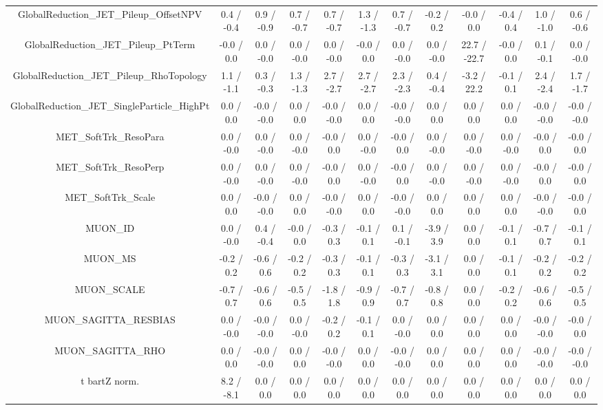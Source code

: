 \begin{table}[htbp]
\begin{center}
\begin{tabular}{|c|c|c|c|c|c|c|c|c|c|c|c|}
  GlobalReduction_JET_Pileup_OffsetNPV & 0.4 / -0.4 & 0.9 / -0.9 & 0.7 / -0.7 & 0.7 / -0.7 & 1.3 / -1.3 & 0.7 / -0.7 & -0.2 / 0.2 & -0.0 / 0.0 & -0.4 / 0.4 & 1.0 / -1.0 & 0.6 / -0.6 \\ 
  GlobalReduction_JET_Pileup_PtTerm & -0.0 / 0.0 & 0.0 / -0.0 & 0.0 / -0.0 & 0.0 / -0.0 & -0.0 / 0.0 & 0.0 / -0.0 & 0.0 / -0.0 & 22.7 / -22.7 & -0.0 / 0.0 & 0.1 / -0.1 & 0.0 / -0.0 \\ 
  GlobalReduction_JET_Pileup_RhoTopology & 1.1 / -1.1 & 0.3 / -0.3 & 1.3 / -1.3 & 2.7 / -2.7 & 2.7 / -2.7 & 2.3 / -2.3 & 0.4 / -0.4 & -3.2 / 22.2 & -0.1 / 0.1 & 2.4 / -2.4 & 1.7 / -1.7 \\ 
  GlobalReduction_JET_SingleParticle_HighPt & 0.0 / 0.0 & -0.0 / -0.0 & 0.0 / 0.0 & -0.0 / -0.0 & 0.0 / 0.0 & -0.0 / -0.0 & 0.0 / 0.0 & 0.0 / 0.0 & 0.0 / 0.0 & -0.0 / -0.0 & -0.0 / -0.0 \\ 
  MET_SoftTrk_ResoPara & 0.0 / -0.0 & 0.0 / -0.0 & 0.0 / -0.0 & -0.0 / 0.0 & 0.0 / -0.0 & -0.0 / 0.0 & 0.0 / -0.0 & 0.0 / -0.0 & 0.0 / -0.0 & -0.0 / 0.0 & -0.0 / 0.0 \\ 
  MET_SoftTrk_ResoPerp & 0.0 / -0.0 & 0.0 / -0.0 & 0.0 / -0.0 & -0.0 / 0.0 & 0.0 / -0.0 & -0.0 / 0.0 & 0.0 / -0.0 & 0.0 / -0.0 & 0.0 / -0.0 & -0.0 / 0.0 & -0.0 / 0.0 \\ 
  MET_SoftTrk_Scale & 0.0 / 0.0 & -0.0 / -0.0 & 0.0 / 0.0 & -0.0 / -0.0 & 0.0 / 0.0 & -0.0 / -0.0 & 0.0 / 0.0 & 0.0 / 0.0 & 0.0 / 0.0 & -0.0 / -0.0 & -0.0 / 0.0 \\ 
  MUON_ID & 0.0 / -0.0 & 0.4 / -0.4 & -0.0 / 0.0 & -0.3 / 0.3 & -0.1 / 0.1 & 0.1 / -0.1 & -3.9 / 3.9 & 0.0 / 0.0 & -0.1 / 0.1 & -0.7 / 0.7 & -0.1 / 0.1 \\ 
  MUON_MS & -0.2 / 0.2 & -0.6 / 0.6 & -0.2 / 0.2 & -0.3 / 0.3 & -0.1 / 0.1 & -0.3 / 0.3 & -3.1 / 3.1 & 0.0 / 0.0 & -0.1 / 0.1 & -0.2 / 0.2 & -0.2 / 0.2 \\ 
  MUON_SCALE & -0.7 / 0.7 & -0.6 / 0.6 & -0.5 / 0.5 & -1.8 / 1.8 & -0.9 / 0.9 & -0.7 / 0.7 & -0.8 / 0.8 & 0.0 / 0.0 & -0.2 / 0.2 & -0.6 / 0.6 & -0.5 / 0.5 \\ 
  MUON_SAGITTA_RESBIAS & 0.0 / -0.0 & -0.0 / -0.0 & 0.0 / -0.0 & -0.2 / 0.2 & -0.1 / 0.1 & 0.0 / -0.0 & 0.0 / 0.0 & 0.0 / 0.0 & 0.0 / 0.0 & -0.0 / -0.0 & -0.0 / 0.0 \\ 
  MUON_SAGITTA_RHO & 0.0 / 0.0 & -0.0 / -0.0 & 0.0 / 0.0 & -0.0 / -0.0 & 0.0 / 0.0 & -0.0 / -0.0 & 0.0 / 0.0 & 0.0 / 0.0 & 0.0 / 0.0 & -0.0 / -0.0 & -0.0 / -0.0 \\ 
  t bar{t}Z norm. & 8.2 / -8.1 & 0.0 / 0.0 & 0.0 / 0.0 & 0.0 / 0.0 & 0.0 / 0.0 & 0.0 / 0.0 & 0.0 / 0.0 & 0.0 / 0.0 & 0.0 / 0.0 & 0.0 / 0.0 & 0.0 / 0.0 \\ 

\end{tabular}
\end{center}
\end{table}
